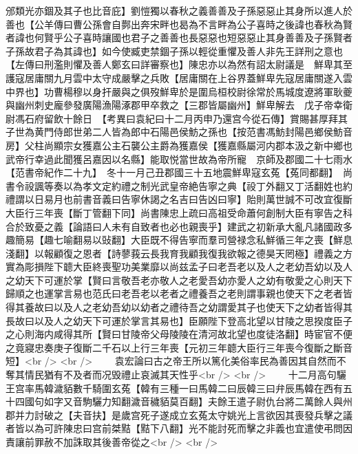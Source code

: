邠類光亦錮及其子也比音庇】劉愷獨以春秋之義善善及子孫惡惡止其身所以進人於善也【公羊傳曰曹公孫會自鄸出奔宋畔也曷為不言畔為公子喜時之後諱也春秋為賢者諱也何賢乎公子喜時讓國也君子之善善也長惡惡也短惡惡止其身善善及子孫賢者子孫故君子為其諱也】如今使臧吏禁錮子孫以輕從重懼及善人非先王詳刑之意也【左傳曰刑濫則懼及善人鄭玄曰詳審察也】陳忠亦以為然有詔太尉議是　鮮卑其至護寇居庸關九月雲中太守成嚴擊之兵敗【居庸關在上谷界蓋鮮卑先寇居庸關遂入雲中界也】功曹楊穆以身扞嚴與之俱歿鮮卑於是圍烏桓校尉徐常於馬城度遼將軍耿夔與幽州刺史龐參發廣陽漁陽涿郡甲卒救之【三郡皆屬幽州】鮮卑解去　戊子帝幸衛尉馮石府留飲十餘日　【考異曰袁紀曰十二月丙申乃還宫今從石傳】賞賜甚厚拜其子世為黄門侍郎世弟二人皆為郎中石陽邑侯魴之孫也【按范書馮魴封陽邑鄉侯魴音房】父柱尚顯宗女獲嘉公主石襲公主爵為獲嘉侯【獲嘉縣屬河内郡本汲之新中鄉也武帝行幸過此聞獲呂嘉因以名縣】能取悦當世故為帝所寵　京師及郡國二十七雨水【范書帝紀作二十九】　冬十一月己丑郡國三十五地震鮮卑寇玄菟【菟同都翻】　尚書令祋諷等奏以為孝文定約禮之制光武皇帝絶告寧之典【祋丁外翻又丁活翻姓也約禮謂以日易月也前書音義曰告寧休謁之名吉曰告凶曰寧】貽則萬世誠不可改宜復斷大臣行三年喪【斷丁管翻下同】尚書陳忠上疏曰高祖受命蕭何創制大臣有寧告之科合於致憂之義【論語曰人未有自致者也必也親喪乎】建武之初新承大亂凡諸國政多趣簡易【趣七喻翻易以䜴翻】大臣既不得告寧而羣司營禄念私鮮循三年之喪【鮮息淺翻】以報顧復之恩者【詩蓼莪云長我育我顧我復我欲報之德昊天罔極】禮義之方實為彫損陛下聼大臣終喪聖功美業靡以尚兹孟子曰老吾老以及人之老幼吾幼以及人之幼天下可運於掌【賢曰言敬吾老亦敬人之老愛吾幼亦愛人之幼有敬愛之心則天下歸順之也運掌言易也范氏曰老吾老以老者之禮養吾之老則謂事親也使天下之老者皆得其養故曰以及人之老幼吾幼以幼者之禮待吾之幼謂愛其子也使天下之幼者皆得其長故曰以及人之幼天下可運於掌言其易也】臣願陛下登高北望以甘陵之思揆度臣子之心則海内咸得其所【賢曰甘陵帝父母陵陵在清河故北望也度徒洛翻】時宦官不便之竟寢忠奏庚子復斷二千石以上行三年喪【元初三年聼大臣行三年喪今復斷之斷音短】<br />
<br />
　　袁宏論曰古之帝王所以篤化美俗率民為善因其自然而不奪其情民猶有不及者而况毁禮止哀滅其天性乎<br />
<br />
　　十二月高句驪王宫率馬韓濊貊數千騎圍玄菟【韓有三種一曰馬韓二曰辰韓三曰弁辰馬韓在西有五十四國句如字又音駒驪力知翻濊音穢貊莫百翻】夫餘王遣子尉仇台將二萬餘人與州郡并力討破之【夫音扶】是歲宫死子遂成立玄菟太守姚光上言欲因其喪發兵擊之議者皆以為可許陳忠曰宫前桀黠【黠下八翻】光不能討死而擊之非義也宜遣使弔問因責讓前罪赦不加誅取其後善帝從之<br />
<br />
